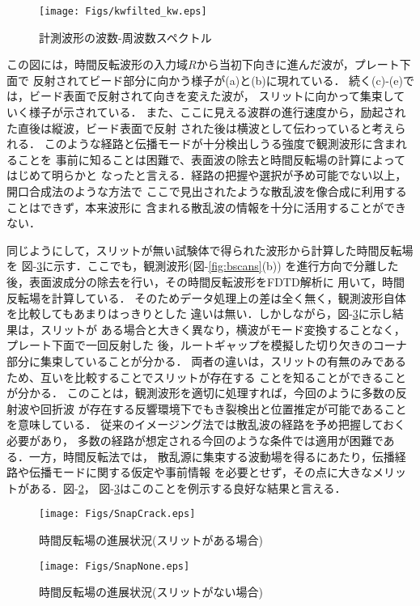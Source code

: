 \begin{figure}[htb]
\centering
	\texttt{[image: Figs/kwfilted\_kw.eps]}
	\caption{計測波形の波数-周波数スペクトル}
	\label{fig:kwfilted_kw}
\end{figure}
この図には，時間反転波形の入力域$R$から当初下向きに進んだ波が，プレート下面で
反射されてビード部分に向かう様子が(a)と(b)に現れている．
続く(c)-(e)では，ビード表面で反射されて向きを変えた波が，
スリットに向かって集束していく様子が示されている．
また、ここに見える波群の進行速度から，励起された直後は縦波，ビード表面で反射
された後は横波として伝わっていると考えられる．
このような経路と伝播モードが十分検出しうる強度で観測波形に含まれることを
事前に知ることは困難で、表面波の除去と時間反転場の計算によってはじめて明らかと
なったと言える．経路の把握や選択が予め可能でない以上，開口合成法のような方法で
ここで見出されたような散乱波を像合成に利用することはできず，本来波形に
含まれる散乱波の情報を十分に活用することができない．

同じようにして，スリットが無い試験体で得られた波形から計算した時間反転場を
{\rm 図}-\ref{fig:snap_none}に示す．ここでも，観測波形({\rm 図}-\ref{fig:bscans}(b))
を進行方向で分離した後，表面波成分の除去を行い，その時間反転波形をFDTD解析に
用いて，時間反転場を計算している．
そのためデータ処理上の差は全く無く，観測波形自体を比較してもあまりはっきりとした
違いは無い．しかしながら，{\rm 図}-\ref{fig:snap_none}に示し結果は，スリットが
ある場合と大きく異なり，横波がモード変換することなく，プレート下面で一回反射した
後，ルートギャップを模擬した切り欠きのコーナ部分に集束していることが分かる．
両者の違いは，スリットの有無のみであるため、互いを比較することでスリットが存在する
ことを知ることができることが分かる．
このことは，観測波形を適切に処理すれば，今回のように多数の反射波や回折波
が存在する反響環境下でもき裂検出と位置推定が可能であることを意味している．
従来のイメージング法では散乱波の経路を予め把握しておく必要があり，
多数の経路が想定される今回のような条件では適用が困難である．一方，時間反転法では，
散乱源に集束する波動場を得るにあたり，伝播経路や伝播モードに関する仮定や事前情報
を必要とせず，その点に大きなメリットがある．{\rm 図}-\ref{fig:snap_crack}，
{\rm 図}-\ref{fig:snap_none}はこのことを例示する良好な結果と言える．
\begin{figure}[htb]
\centering
	\texttt{[image: Figs/SnapCrack.eps]}
	\caption{時間反転場の進展状況(スリットがある場合)}
	\label{fig:snap_crack}
\end{figure}
\begin{figure}[htb]
\centering
	\texttt{[image: Figs/SnapNone.eps]}
	\caption{時間反転場の進展状況(スリットがない場合)}
	\label{fig:snap_none}
\end{figure}
